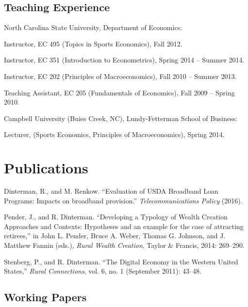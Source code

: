 \documentclass[letterpaper]{article}
\renewenvironment{itemize}{
  \begin{list}{}{
    \setlength{\leftmargin}{1.5em}
  }
}{
  \end{list}
}
\begin{document}
\subsection*{Teaching Experience}
\begin{itemize}
\item North Carolina State University, Department of Economics:
\begin{itemize}
\item Instructor, EC 495 (Topics in Sports Economics), Fall 2012.
\item Instructor, EC 351 (Introduction to Econometrics), Spring 2014 -- Summer 2014.
\item Instructor, EC 202 (Principles of Macroeconomics), Fall 2010 -- Summer 2013.
\item Teaching Assistant, EC 205 (Fundamentals of Economics), Fall 2009 -- Spring 2010.
\end{itemize}

\item Campbell University (Buies Creek, NC), Lundy-Fetterman School of Business:
\begin{itemize}
\item Lecturer, (Sports Economics, Principles of Macroeconomics), Spring 2014.
\end{itemize}
\end{itemize}

\section*{Publications}

\begin{itemize}
\item Dinterman, R., and M. Renkow. ``Evaluation of USDA Broadband Loan Programs: Impacts on broadband provision.'' \emph{Telecommunications Policy} (2016).
\item Pender, J., and R. Dinterman. ``Developing a Typology of Wealth Creation Approaches and Contexts: Hypotheses and an example for the case of attracting retirees,'' in  John L. Pender, Bruce A. Weber, Thomas G. Johnson, and J. Matthew Fannin (eds.), \emph{Rural Wealth Creation}, Taylor \& Francis, 2014: 269--290.
\item Stenberg, P., and R. Dinterman. ``The Digital Economy in the Western United States,'' \emph{Rural Connections}, vol. 6, no. 1 (September 2011): 43--48.
\end{itemize}

\subsection*{Working Papers}
\end{document}
